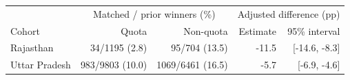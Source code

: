 \begin{tabular}{lrrrr}
\toprule
 & \multicolumn{2}{c}{Matched / prior winners (\%)} & \multicolumn{2}{c}{Adjusted difference (pp)} \\
Cohort & Quota & Non-quota & Estimate & 95\% interval \\
\midrule
Rajasthan & 34/1195 (2.8) & 95/704 (13.5) & -11.5 & [-14.6, -8.3] \\
Uttar Pradesh & 983/9803 (10.0) & 1069/6461 (16.5) & -5.7 & [-6.9, -4.6] \\
\bottomrule
\end{tabular}
